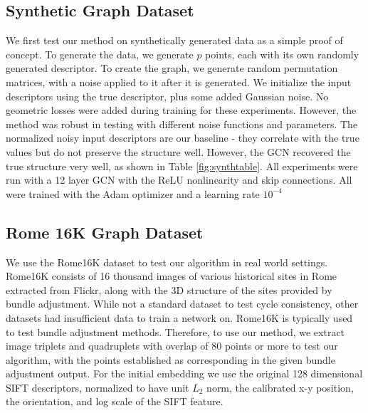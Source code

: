\documentclass[10pt,twocolumn,letterpaper]{article}
\begin{document}
\subsection{Synthetic Graph Dataset}
We first test our method on synthetically generated data as a simple proof of concept.
To generate the data, we generate $p$ points, each with its own randomly generated descriptor.
To create the graph, we generate random permutation matrices, with a noise applied to it after it is generated.
We initialize the input descriptors using the true descriptor, plus some added Gaussian noise.
No geometric losses were added during training for these experiments.
However, the method was robust in testing with different noise functions and parameters.
The normalized noisy input descriptors are our baseline - they correlate with the true values but do not preserve the structure well.
However, the GCN recovered the true structure very well, as shown in Table \ref{fig:synthtable}.
All experiments were run with a 12 layer GCN with the ReLU nonlinearity and skip connections.
All were trained with the Adam optimizer \cite{kingma2014adam} and a learning rate $10^{-4}$


\subsection{Rome 16K Graph Dataset}
We  use the Rome16K dataset \cite{li2010location} to test our algorithm in real world settings.
Rome16K consists of 16 thousand images of various historical sites in Rome extracted from Flickr, along with the 3D structure of the sites provided by bundle adjustment.
While not a standard dataset to test cycle consistency, other datasets had insufficient data to train a network on.
Rome16K is typically used to test bundle adjustment methods.
Therefore, to use our method, we extract image triplets and quadruplets with overlap of 80 points or more to test our algorithm, with the points established as corresponding in the given bundle adjustment output.
For the initial embedding we use the original 128 dimensional SIFT descriptors, normalized to have unit $L_2$ norm, the calibrated x-y position, the orientation, and log scale of the SIFT feature.
\end{document}
